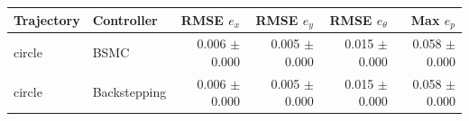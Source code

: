 \begin{tabular}{llrrrr}
\hline
Trajectory & Controller & RMSE $e_x$ & RMSE $e_y$ & RMSE $e_\theta$ & Max $e_p$ \\
\hline
circle & BSMC & 0.006 $\pm$ 0.000 & 0.005 $\pm$ 0.000 & 0.015 $\pm$ 0.000 & 0.058 $\pm$ 0.000 \\
circle & Backstepping & 0.006 $\pm$ 0.000 & 0.005 $\pm$ 0.000 & 0.015 $\pm$ 0.000 & 0.058 $\pm$ 0.000 \\
\hline
\end{tabular}
